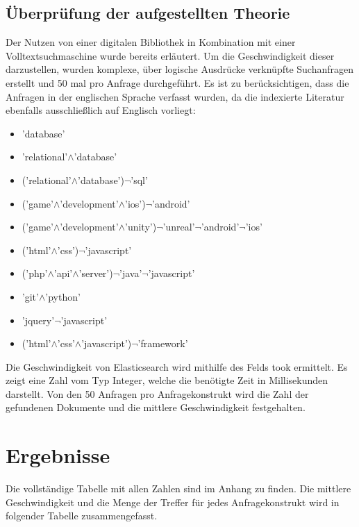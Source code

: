 \documentclass[a4paper]{scrartcl}
\begin{document}
\subsection{Überprüfung der aufgestellten Theorie}
Der Nutzen von einer digitalen Bibliothek in Kombination mit einer Volltextsuchmaschine wurde bereits erläutert. Um die Geschwindigkeit dieser darzustellen, wurden komplexe, über logische Ausdrücke verknüpfte Suchanfragen erstellt und 50 mal pro Anfrage durchgeführt. Es ist zu berücksichtigen, dass die Anfragen in der englischen Sprache verfasst wurden, da die indexierte Literatur ebenfalls ausschließlich auf Englisch vorliegt:

\begin{itemize}
	\item 'database'
	\item 'relational'$\land$'database'
	\item ('relational'$\land$'database')$\neg$'sql'
	\item ('game'$\land$'development'$\land$'ios')$\neg$'android'
	\item ('game'$\land$'development'$\land$'unity')$\neg$'unreal'$\neg$'android'$\neg$'ios'
	\item ('html'$\land$'css')$\neg$'javascript'
	\item ('php'$\land$'api'$\land$'server')$\neg$'java'$\neg$'javascript'
	\item 'git'$\land$'python'
	\item 'jquery'$\neg$'javascript'
	\item ('html'$\land$'css'$\land$'javascript')$\neg$'framework'
\end{itemize}

Die Geschwindigkeit von Elasticsearch wird mithilfe des Felds took ermittelt. Es zeigt eine Zahl vom Typ Integer, welche die benötigte Zeit in Millisekunden darstellt. Von den 50 Anfragen pro Anfragekonstrukt wird die Zahl der gefundenen Dokumente und die mittlere Geschwindigkeit festgehalten.

\newpage

\section{Ergebnisse}
Die vollständige Tabelle mit allen Zahlen sind im Anhang zu finden. Die mittlere Geschwindigkeit und die Menge der Treffer für jedes Anfragekonstrukt wird in folgender Tabelle zusammengefasst.
\end{document}
